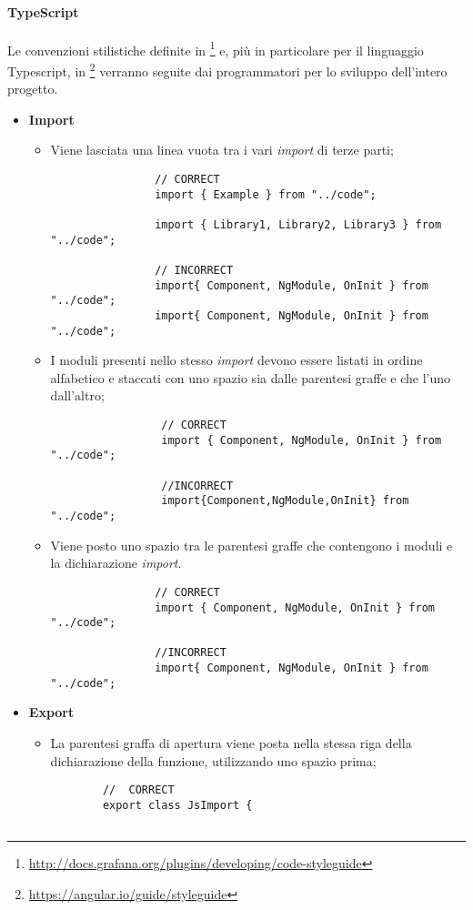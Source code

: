 \paragraph{TypeScript}\Spazio
Le convenzioni stilistiche definite in \footnote{\url{http://docs.grafana.org/plugins/developing/code-styleguide}} e, più in particolare per il linguaggio Typescript, in \footnote{\url{https://angular.io/guide/styleguide}} verranno seguite dai programmatori per lo sviluppo dell'intero progetto.

\begin{itemize}
	\item{\textbf{Import}}
		\begin{itemize}
			\item{Viene lasciata una linea vuota tra i vari \emph{import} di terze parti;}
				\begin{lstlisting}
				// CORRECT
				import { Example } from "../code";  
				
				import { Library1, Library2, Library3 } from "../code";
				
				// INCORRECT
				import{ Component, NgModule, OnInit } from "../code";  
				import{ Component, NgModule, OnInit } from "../code";
				\end{lstlisting}
			
			\item{I moduli presenti nello stesso \emph{import} devono essere listati in
			ordine alfabetico e staccati con uno spazio sia dalle parentesi graffe e che l'uno dall'altro;}
				 \begin{lstlisting}
				 // CORRECT
				 import { Component, NgModule, OnInit } from "../code";  
				 
				 //INCORRECT
				 import{Component,NgModule,OnInit} from "../code";  
				 \end{lstlisting}
			\item{Viene posto uno spazio tra le parentesi graffe che contengono i moduli e la dichiarazione \emph{import}.}
				\begin{lstlisting}
				// CORRECT
				import { Component, NgModule, OnInit } from "../code";  
				
				//INCORRECT
				import{ Component, NgModule, OnInit } from "../code";  
				\end{lstlisting}
		\end{itemize} 
	
	\item{\textbf{Export}} 
		\begin{itemize}
		\item{La parentesi graffa di apertura viene posta nella stessa riga della dichiarazione della funzione, utilizzando uno spazio prima;}
		\begin{lstlisting}
		//  CORRECT
		export class JsImport {  
		

\end{lstlisting}
\end{itemize}
\end{itemize}
